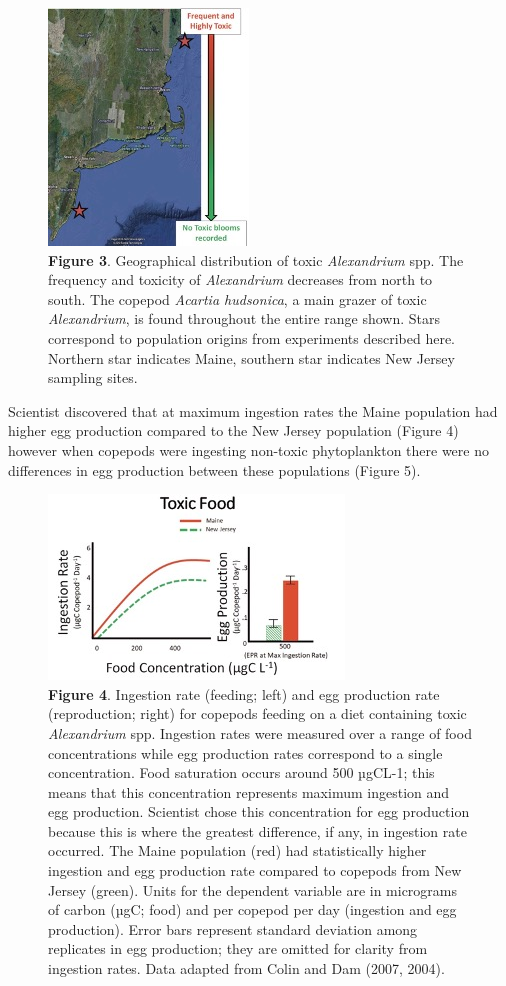 \documentclass[
]{book}
\begin{document}
\begin{figure}
\centering
\includegraphics{images/figure3.png}
\caption{\textbf{Figure 3}. Geographical distribution of toxic \emph{Alexandrium} spp. The frequency and toxicity of \emph{Alexandrium} decreases from north to south. The copepod \emph{Acartia hudsonica}, a main grazer of toxic \emph{Alexandrium}, is found throughout the entire range shown. Stars correspond to population origins from experiments described here. Northern star indicates Maine, southern star indicates New Jersey sampling sites.}
\end{figure}

Scientist discovered that at maximum ingestion rates the Maine population had higher egg production compared to the New Jersey population (Figure 4) however when copepods were ingesting non-toxic phytoplankton there were no differences in egg production between these populations (Figure 5).

\begin{figure}
\centering
\includegraphics{images/figure4.png}
\caption{\textbf{Figure 4}. Ingestion rate (feeding; left) and egg production rate (reproduction; right) for copepods feeding on a diet containing toxic \emph{Alexandrium} spp. Ingestion rates were measured over a range of food concentrations while egg production rates correspond to a single concentration. Food saturation occurs around 500 µgCL-1; this means that this concentration represents maximum ingestion and egg production. Scientist chose this concentration for egg production because this is where the greatest difference, if any, in ingestion rate occurred. The Maine population (red) had statistically higher ingestion and egg production rate compared to copepods from New Jersey (green). Units for the dependent variable are in micrograms of carbon (µgC; food) and per copepod per day (ingestion and egg production). Error bars represent standard deviation among replicates in egg production; they are omitted for clarity from ingestion rates. Data adapted from Colin and Dam (2007, 2004).}
\end{figure}
\end{document}
